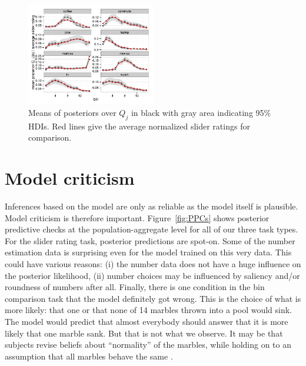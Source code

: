 \documentclass[10pt,letterpaper]{article}
\begin{document}
\begin{figure}
  \centering
  \includegraphics[width = 0.5\textwidth]{plots/pop_priors.pdf}
  \caption{Means of posteriors over $Q_j$ in black with gray area indicating 95\% HDIs. Red
    lines give the average normalized slider ratings for comparison.}
  \label{fig:PosteriorQj}
\end{figure}

\section{Model criticism}

Inferences based on the model are only as reliable as the model itself is plausible. Model
criticism is therefore important. Figure~\ref{fig:PPCs} shows posterior predictive checks at
the population-aggregate level for all of our three task types. For the slider rating task,
posterior predictions are spot-on. Some of the number estimation data is surprising even for
the model trained on this very data. This could have various reasons: (i) the number data does
not have a huge influence on the posterior likelihood, (ii) number choices may be influenced by
saliency and/or roundness of numbers after all. Finally, there is one condition in the bin
comparison task that the model definitely got wrong. This is the choice of what is more likely:
that one or that none of 14 marbles thrown into a pool would sink. The model would predict that
almost everybody should answer that it is more likely that one marble sank. But that is not
what we observe. It may be that subjects revise beliefs about ``normality'' of the marbles,
while holding on to an assumption that all marbles behave the same
\cite{DegenTessler2015:Wonky-worlds:-L}.
\end{document}
